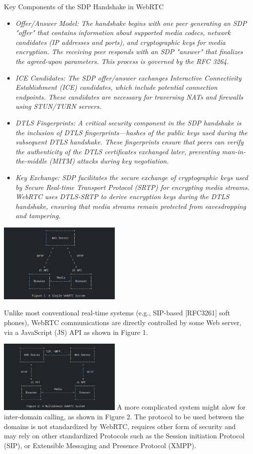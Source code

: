 \documentclass[conference]{IEEEtran}
\begin{document}
Key Components of the SDP Handshake in WebRTC
\begin{itemize}
    \item \it{Offer/Answer Model:} The handshake begins with one peer generating an SDP "offer" that contains information about supported media codecs, network candidates 
    (IP addresses and ports), and cryptographic keys for media encryption. The receiving peer responds with an SDP "answer" that finalizes 
    the agreed-upon parameters. This process is governed by the RFC 3264.
    \item \it{ICE Candidates:} The SDP offer/answer exchanges Interactive Connectivity Establishment (ICE) candidates, which include potential connection 
    endpoints. These candidates are necessary for traversing NATs and firewalls using STUN/TURN servers.
    \item \it{DTLS Fingerprints:} A critical security component in the SDP handshake is the inclusion of DTLS fingerprints—hashes of the public keys used during
    the subsequent DTLS handshake. These fingerprints ensure that peers can verify the authenticity of the DTLS certificates exchanged 
    later, preventing man-in-the-middle (MITM) attacks during key negotiation.
    \item \it{Key Exchange:} SDP facilitates the secure exchange of cryptographic keys used by Secure Real-time Transport Protocol (SRTP) for encrypting 
    media streams. WebRTC uses DTLS-SRTP to derive encryption keys during the DTLS handshake, ensuring that media streams remain 
    protected from eavesdropping and tampering.
\end{itemize}

\includegraphics[width=0.45\textwidth]{WebRTC basic Structure}

Unlike most conventional real-time systems (e.g., SIP-based [RFC3261] soft phones), WebRTC 
communications are directly controlled by some Web server, via a JavaScript (JS) API as shown in Figure 1.

\includegraphics[width=0.45\textwidth]{multi domain calling.png}
A more complicated system might alow for inter-domain calling, as shown in Figure 2. The protocol to be used between the domains 
is not standardized by WebRTC, requires other form of security and may rely on other standardized Protocols such as the
Session initiation Protocol (SIP), or Extensible Messaging and Presence Protocol (XMPP). \cite{RFC8827}
\end{document}
